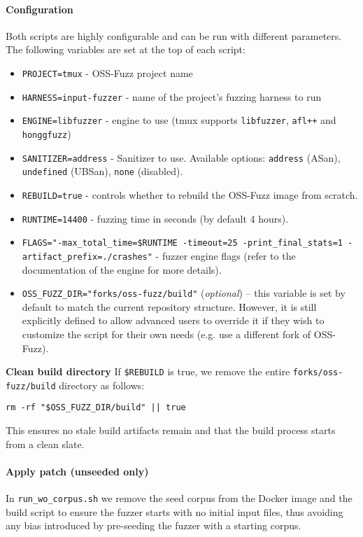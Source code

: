 \documentclass[11pt,a4paper,twocolumn]{article}
\begin{document}
\noindent \paragraph{Configuration} \label{sec:methodology_configuration} Both scripts are highly configurable and can be run with different parameters. The following variables are set at the top of each script:
\begin{itemize}
	\item \texttt{PROJECT=tmux} - OSS-Fuzz project name
	\item \texttt{HARNESS=input-fuzzer} - name of the project's fuzzing harness to run
	\item \texttt{ENGINE=libfuzzer} - engine to use (tmux supports \texttt{libfuzzer}, \texttt{afl++} and \texttt{honggfuzz})
	\item \texttt{SANITIZER=address} - Sanitizer to use. Available options: \texttt{address} (ASan), \texttt{undefined} (UBSan), \texttt{none} (disabled). \cite{oss-fuzz:tmux_project_yaml}
	\item \texttt{REBUILD=true} - controls whether to rebuild the OSS-Fuzz image from scratch.
	\item \texttt{RUNTIME=14400} - fuzzing time in seconds (by default 4 hours).
	\item \texttt{FLAGS="-max\_total\_time=\$RUNTIME -timeout=25 -print\_final\_stats=1 -artifact\_prefix=./crashes"} - fuzzer engine flags (refer to the documentation of the engine for more details).
	\item \texttt{OSS\_FUZZ\_DIR="forks/oss-fuzz/build"} (\emph{optional}) – this variable is set by default to match the current repository structure. However, it is still explicitly defined to allow advanced users to override it if they wish to customize the script for their own needs (e.g. use a different fork of OSS-Fuzz).
\end{itemize}

\noindent \textbf{Clean build directory} If \texttt{\$REBUILD} is true, we remove the entire \texttt{forks/oss-fuzz/build} directory as follows:

\begin{verbatim}
rm -rf "$OSS_FUZZ_DIR/build" || true
\end{verbatim}

This ensures no stale build artifacts remain and that the build process starts from a clean slate.

\noindent \paragraph{Apply patch (unseeded only)} In \texttt{run\_wo\_corpus.sh} we remove the seed corpus from the Docker image and the build script to ensure the fuzzer starts with no initial input files, thus avoiding any bias introduced by pre-seeding the fuzzer with a starting corpus.
\end{document}
